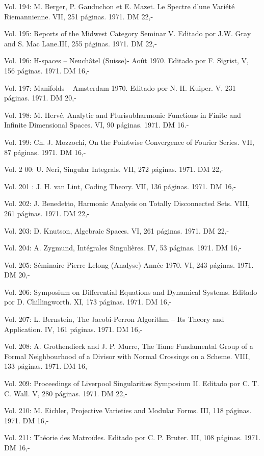 Vol. 194: M. Berger, P. Gauduchon et E. Mazet. Le Spectre d'une Variété Riemannienne. VII, 251 páginas. 1971. DM 22,-

Vol. 195: Reports of the Midwest Category Seminar V. Editado por J.W. Gray and S. Mac Lane.III, 255 páginas. 1971. DM 22,-

Vol. 196: H-spaces -- Neuchâtel (Suisse)- Août 1970. Editado por F. Sigrist, V, 156 páginas. 1971. DM 16,-

Vol. 197: Manifolds -- Amsterdam 1970. Editado por N. H. Kuiper. V, 231 páginas. 1971. DM 20,-

Vol. 198: M. Hervé, Analytic and Plurisubharmonic Functions in Finite and Infinite Dimensional Spaces. VI, 90 páginas. 1971. DM 16.-

Vol. 199: Ch. J. Mozzochi, On the Pointwise Convergence of Fourier Series. VII, 87 páginas. 1971. DM 16,-

Vol. 2 00: U. Neri, Singular Integrals. VII, 272 páginas. 1971. DM 22,-

Vol. 201 : J. H. van Lint, Coding Theory. VII, 136 páginas. 1971. DM 16,-

Vol. 202: J. Benedetto, Harmonic Analysis on Totally Disconnected Sets. VIII, 261 páginas. 1971. DM 22,-

Vol. 203: D. Knutson, Algebraic Spaces. VI, 261 páginas. 1971. DM 22,-

Vol. 204: A. Zygmund, Intégrales Singulières. IV, 53 páginas. 1971. DM 16,-

Vol. 205: Séminaire Pierre Lelong (Analyse) Année 1970. VI, 243 páginas. 1971. DM 20,-

Vol. 206: Symposium on Differential Equations and Dynamical Systems. Editado por D. Chillingworth. XI, 173 páginas. 1971. DM 16,-

Vol. 207: L. Bernstein, The Jacobi-Perron Algorithm -- Its Theory and Application. IV, 161 páginas. 1971. DM 16,-

Vol. 208: A. Grothendieck and J. P. Murre, The Tame Fundamental Group of a Formal Neighbourhood of a Divisor with Normal Crossings on a Scheme. VIII, 133 páginas. 1971. DM 16,-

Vol. 209: Proceedings of Liverpool Singularities \quad Symposium II. Editado por C. T. C. Wall. V, 280 páginas. 1971. DM 22,-

Vol. 210: M. Eichler, Projective Varieties and Modular Forms. III, 118 páginas. 1971. DM 16,-

Vol. 211: Théorie des Matroïdes. Editado por C. P. Bruter. III, 108 páginas. 1971. DM 16,-

